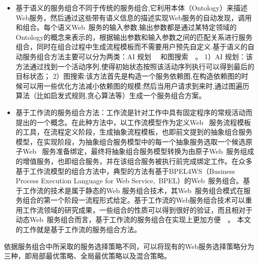 \begin{itemize}

    \item 基于语义的服务组合不同于传统的服务组合,它利用本体（Ontology）来描述Web服务，然后通过这些带有语义信息的描述实现Web服务的自动发现，调用和组合。每个语义Web~服务的输入参数,输出参数都是通过某特定领域的Ontology的概念来表示的，根据输出参数和输入参数之间的匹配关系进行服务组合，同时在组合过程中生成流程模板而不需要用户预先自定义.基于语义的自动服务组合方法主要可以分为两类：AI 规划~\cite{sirin2004htn,kun2009markov}~ 和图搜索~\cite{rodriguez2011automatic,liang2005and}~。
        1）AI 规划：该方法通过找到一个活动序列,使得初始状态按照该活动序列执行可以得到最后的目标状态；
        2）图搜索:该方法首先是构造一个服务依赖图,在构造依赖图的时候可以用一些优化方法减小依赖图的规模;然后当用户请求到来时,通过图遍历算法（比如启发式规则,贪心算法等）生成一个服务组合方案。

    \item 基于工作流的服务组合方法：工作流是针对工作中具有固定程序的常规活动而提出的一个概念。在此种方法中，以工作流模型作为定义Web~ 服务流程模板的工具，在流程定义阶段，生成抽象流程模板，也即前文提到的抽象组合服务模型，在实现阶段，为抽象组合服务模型中的每一个抽象服务选取一个候选原子Web~ 服务准备绑定，最终将抽象组合服务模型转换为由原子Web~服务组成的增值服务，也即组合服务，并在该组合服务被执行前完成绑定工作。在众多基于工作流模型的组合方法中，典型的方法有基于BPEL4WS（Business Process Execution Language for Web Service,~BPEL）的Web~服务组合。基于工作流的技术是属于静态的Web 服务组合技术，其Web~服务组合模式在服务组合的第一个阶段一流程形式给定。基于工作流的Web服务组合技术可以重用工作流领域的研究成果，一些组合的性质可以得到很好的验证，而且相对于动态Web~服务组合而言，基于工作流的服务组合在实现上更加方便~\cite{stein2009flexible,deng2014service,yu2013efficient,alrifai2009combining}~。 本文的工作就是基于工作流的服务组合方法。

\end{itemize}

依据服务组合中所采取的服务选择策略不同，可以将现有的Web服务选择策略分为三种，即局部最优策略、全局最优策略以及混合策略。

